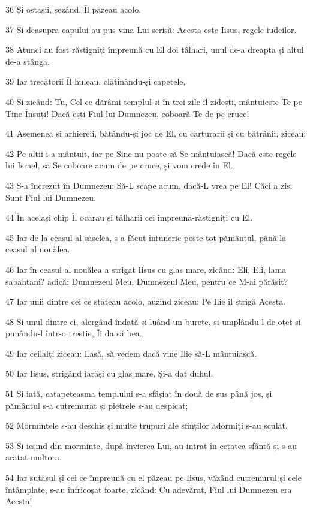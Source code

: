 \par 36 Și ostașii, șezând, Îl păzeau acolo.
\par 37 Și deasupra capului au pus vina Lui scrisă: Acesta este Iisus, regele iudeilor.
\par 38 Atunci au fost răstigniți împreună cu El doi tâlhari, unul de-a dreapta și altul de-a stânga.
\par 39 Iar trecătorii Îl huleau, clătinându-și capetele,
\par 40 Și zicând: Tu, Cel ce dărâmi templul și în trei zile îl zidești, mântuiește-Te pe Tine Însuți! Dacă ești Fiul lui Dumnezeu, coboară-Te de pe cruce!
\par 41 Asemenea și arhiereii, bătându-și joc de El, cu cărturarii și cu bătrânii, ziceau:
\par 42 Pe alții i-a mântuit, iar pe Sine nu poate să Se mântuiască! Dacă este regele lui Israel, să Se coboare acum de pe cruce, și vom crede în El.
\par 43 S-a încrezut în Dumnezeu: Să-L scape acum, dacă-L vrea pe El! Căci a zis: Sunt Fiul lui Dumnezeu.
\par 44 În același chip Îl ocărau și tâlharii cei împreună-răstigniți cu El.
\par 45 Iar de la ceasul al șaselea, s-a făcut întuneric peste tot pământul, până la ceasul al nouălea.
\par 46 Iar în ceasul al nouălea a strigat Iisus cu glas mare, zicând: Eli, Eli, lama sabahtani? adică: Dumnezeul Meu, Dumnezeul Meu, pentru ce M-ai părăsit?
\par 47 Iar unii dintre cei ce stăteau acolo, auzind ziceau: Pe Ilie îl strigă Acesta.
\par 48 Și unul dintre ei, alergând îndată și luând un burete, și umplându-l de oțet și punându-l într-o trestie, Îi da să bea.
\par 49 Iar ceilalți ziceau: Lasă, să vedem dacă vine Ilie să-L mântuiască.
\par 50 Iar Iisus, strigând iarăși cu glas mare, Și-a dat duhul.
\par 51 Și iată, catapeteasma templului s-a sfâșiat în două de sus până jos, și pământul s-a cutremurat și pietrele s-au despicat;
\par 52 Mormintele s-au deschis și multe trupuri ale sfinților adormiți s-au sculat.
\par 53 Și ieșind din morminte, după învierea Lui, au intrat în cetatea sfântă și s-au arătat multora.
\par 54 Iar sutașul și cei ce împreună cu el păzeau pe Iisus, văzând cutremurul și cele întâmplate, s-au înfricoșat foarte, zicând: Cu adevărat, Fiul lui Dumnezeu era Acesta!
